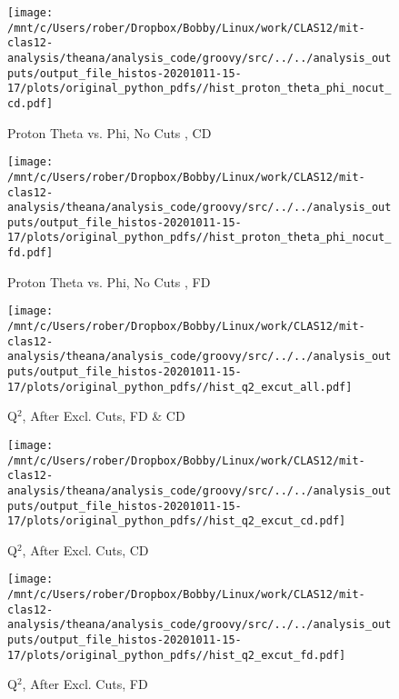 \documentclass{article}
\begin{document}
\begin{landscape}
\begin{figure}[h]
        \texttt{[image: /mnt/c/Users/rober/Dropbox/Bobby/Linux/work/CLAS12/mit-clas12-analysis/theana/analysis\_code/groovy/src/../../analysis\_outputs/output\_file\_histos-20201011-15-17/plots/original\_python\_pdfs//hist\_proton\_theta\_phi\_nocut\_cd.pdf]}
        \captionsetup{textformat=empty,labelformat=blank}
        \caption{Proton Theta vs. Phi, No Cuts , CD}
    \end{figure}
    \clearpage
    
    \begin{figure}[h]
        \centering

        \texttt{[image: /mnt/c/Users/rober/Dropbox/Bobby/Linux/work/CLAS12/mit-clas12-analysis/theana/analysis\_code/groovy/src/../../analysis\_outputs/output\_file\_histos-20201011-15-17/plots/original\_python\_pdfs//hist\_proton\_theta\_phi\_nocut\_fd.pdf]}
        \captionsetup{textformat=empty,labelformat=blank}
        \caption{Proton Theta vs. Phi, No Cuts , FD}
    \end{figure}
    \clearpage
    
    \begin{figure}[h]
        \centering

        \texttt{[image: /mnt/c/Users/rober/Dropbox/Bobby/Linux/work/CLAS12/mit-clas12-analysis/theana/analysis\_code/groovy/src/../../analysis\_outputs/output\_file\_histos-20201011-15-17/plots/original\_python\_pdfs//hist\_q2\_excut\_all.pdf]}
        \captionsetup{textformat=empty,labelformat=blank}
        \caption{Q$^{2}$, After Excl. Cuts, FD \& CD}
    \end{figure}
    \clearpage
    
    \begin{figure}[h]
        \centering

        \texttt{[image: /mnt/c/Users/rober/Dropbox/Bobby/Linux/work/CLAS12/mit-clas12-analysis/theana/analysis\_code/groovy/src/../../analysis\_outputs/output\_file\_histos-20201011-15-17/plots/original\_python\_pdfs//hist\_q2\_excut\_cd.pdf]}
        \captionsetup{textformat=empty,labelformat=blank}
        \caption{Q$^{2}$, After Excl. Cuts, CD}
    \end{figure}
    \clearpage
    
    \begin{figure}[h]
        \centering

        \texttt{[image: /mnt/c/Users/rober/Dropbox/Bobby/Linux/work/CLAS12/mit-clas12-analysis/theana/analysis\_code/groovy/src/../../analysis\_outputs/output\_file\_histos-20201011-15-17/plots/original\_python\_pdfs//hist\_q2\_excut\_fd.pdf]}
        \captionsetup{textformat=empty,labelformat=blank}
        \caption{Q$^{2}$, After Excl. Cuts, FD}
    \end{figure}
    \clearpage
    

\end{landscape}
\end{document}
